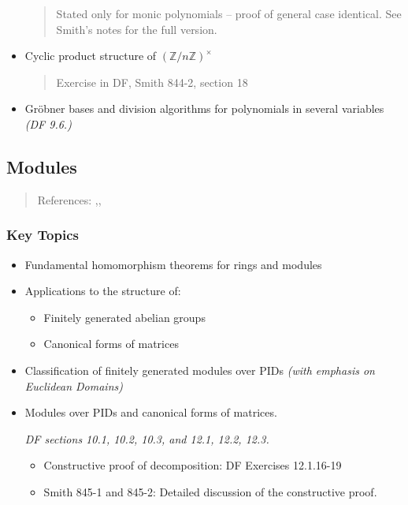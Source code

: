 \begin{itemize}
  \begin{quote}
  Stated only for monic polynomials -- proof of general case identical.
  See Smith's notes for the full version.
  \end{quote}
\item
  Cyclic product structure of \(({\mathbb{Z}}/n{\mathbb{Z}})^{\times}\)

  \begin{quote}
  Exercise in DF, Smith 844-2, section 18
  \end{quote}
\item
  Gröbner bases and division algorithms for polynomials in several
  variables \emph{(DF 9.6.)}
\end{itemize}

\hypertarget{modules}{%
\subsection{Modules}\label{modules}}

\begin{quote}
References:
\autocite{dummit_foote_2004},\autocite{hungerford_2008},\autocite{smith}
\end{quote}

\hypertarget{key-topics-3}{%
\subsubsection{Key Topics}\label{key-topics-3}}

\begin{itemize}
\item
  Fundamental homomorphism theorems for rings and modules
\item
  Applications to the structure of:

  \begin{itemize}
  \tightlist
  \item
    Finitely generated abelian groups
  \item
    Canonical forms of matrices
  \end{itemize}
\item
  Classification of finitely generated modules over PIDs \emph{(with
  emphasis on Euclidean Domains)}
\item
  Modules over PIDs and canonical forms of matrices.

  \emph{DF sections 10.1, 10.2, 10.3, and 12.1, 12.2, 12.3.}

  \begin{itemize}
  \item
    Constructive proof of decomposition: DF Exercises 12.1.16-19
  \item
    Smith 845-1 and 845-2: Detailed discussion of the constructive
    proof.
  \end{itemize}
\end{itemize}

